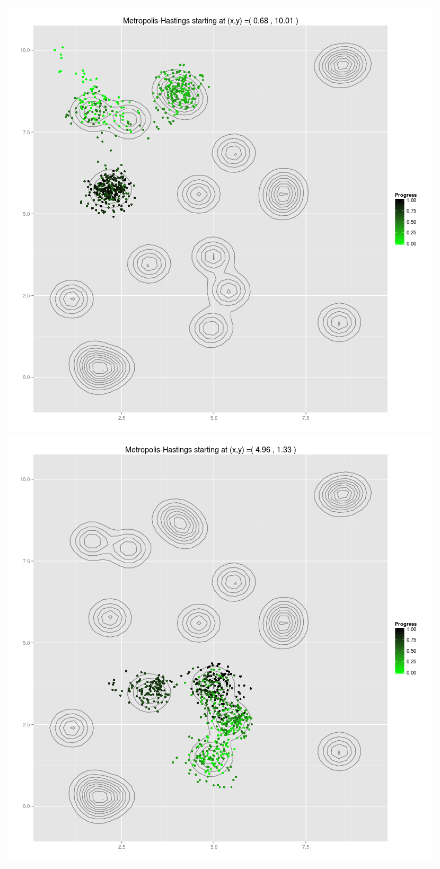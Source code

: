 \begin{figure}
	\begin{minipage}[b]{.5\linewidth}
		\centering \includegraphics[scale=.25]{./img/MH_simululation_1000_steps_ex1.png}
	\end{minipage}%
	\begin{minipage}[b]{.5\linewidth}
		\centering \includegraphics[scale=.25]{./img/MH_simululation_1000_steps_ex2.png}

\end{minipage}
\end{figure}
